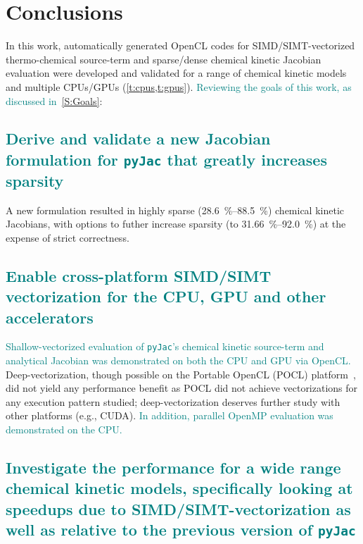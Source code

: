 \documentclass[12pt,number,sort&compress,preprint]{elsarticle}
\newcommand{\add}[1]{{\sloppy\textcolor{teal}{#1}}}  %
\begin{document}
\section{Conclusions}
In this work, automatically generated OpenCL codes for SIMD\slash SIMT-vectorized thermo-chemical source-term and sparse\slash dense chemical kinetic Jacobian evaluation were developed and validated for a range of chemical kinetic models~\cite{Burke:2011fh,smith_gri-mech_30,Wang:2007,Sarathy:2013jr} and multiple CPUs\slash GPUs (\cref{t:cpus,t:gpus}).
\add{Reviewing the goals of this work, as discussed in~\cref{S:Goals}}:

\subsection{\add{Derive and validate a new Jacobian formulation for \texttt{pyJac} that greatly increases sparsity}}
A new formulation resulted in highly sparse (\SIrange{28.6}{88.5}{\percent}) chemical kinetic Jacobians, with options to futher increase sparsity (to \SIrange{31.66}{92.0}{\percent}) at the expense of strict correctness.

\subsection{\add{Enable cross-platform SIMD\slash SIMT vectorization for the CPU, GPU and other accelerators}}
\add{Shallow-vectorized evaluation of \texttt{pyJac}'s chemical kinetic source-term and analytical Jacobian was demonstrated on both the CPU and GPU via OpenCL.}
Deep-vectorization, though possible on the Portable OpenCL (POCL) platform~\cite{poclIJPP}, did not yield any performance benefit as POCL did not achieve vectorizations for any execution pattern studied; deep-vectorization deserves further study with other platforms (e.g., CUDA).
\add{In addition, parallel OpenMP evaluation was demonstrated on the CPU.}

\subsection{\add{Investigate the performance for a wide range chemical kinetic models, specifically looking at speedups due to SIMD\slash SIMT-vectorization as well as relative to the previous version of \texttt{pyJac}}}
\end{document}
